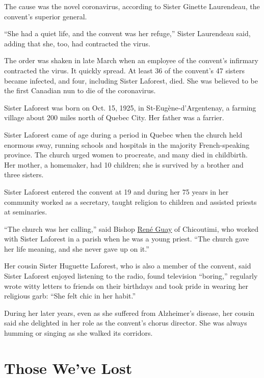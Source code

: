 The cause was the novel coronavirus, according to Sister Ginette
Laurendeau, the convent's superior general.

``She had a quiet life, and the convent was her refuge,'' Sister
Laurendeau said, adding that she, too, had contracted the virus.

The order was shaken in late March when an employee of the convent's
infirmary contracted the virus. It quickly spread. At least 36 of the
convent's 47 sisters became infected, and four, including Sister
Laforest, died. She was believed to be the first Canadian nun to die of
the coronavirus.

Sister Laforest was born on Oct. 15, 1925, in St-Eugène-d'Argentenay, a
farming village about 200 miles north of Quebec City. Her father was a
farrier.

Sister Laforest came of age during a period in Quebec when the church
held enormous sway, running schools and hospitals in the majority
French-speaking province. The church urged women to procreate, and many
died in childbirth. Her mother, a homemaker, had 10 children; she is
survived by a brother and three sisters.

Sister Laforest entered the convent at 19 and during her 75 years in her
community worked as a secretary, taught religion to children and
assisted priests at seminaries.

``The church was her calling,'' said Bishop
\href{http://www.evechedechicoutimi.qc.ca/page/mgr-rene-guay/}{René
Guay} of Chicoutimi, who worked with Sister Laforest in a parish when he
was a young priest. ``The church gave her life meaning, and she never
gave up on it.''

Her cousin Sister Huguette Laforest, who is also a member of the
convent, said Sister Laforest enjoyed listening to the radio, found
television ``boring,'' regularly wrote witty letters to friends on their
birthdays and took pride in wearing her religious garb: ``She felt chic
in her habit.''

During her later years, even as she suffered from Alzheimer's disease,
her cousin said she delighted in her role as the convent's chorus
director. She was always humming or singing as she walked its corridors.

\href{https://www.nytimes.com/interactive/2020/obituaries/people-died-coronavirus-obituaries.html?action=click\&pgtype=Article\&state=default\&region=BELOW_MAIN_CONTENT\&context=covid_obits_promo}{}

\hypertarget{those-weve-lost}{%
\section{Those We've Lost}\label{those-weve-lost}}

